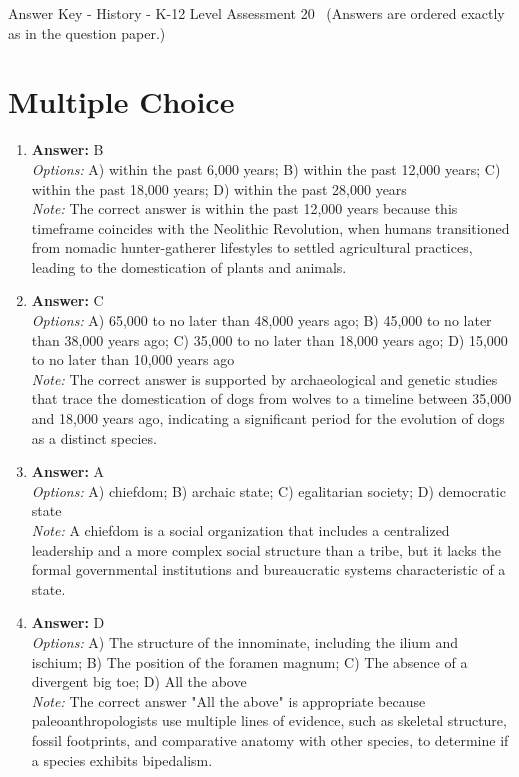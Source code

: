 \documentclass[12pt]{article}
\begin{document}
\begin{center}
Answer Key - History - K-12 Level Assessment 20 \
\small (Answers are ordered exactly as in the question paper.)
\end{center}

\section*{Multiple Choice}
\begin{enumerate}[label=\arabic*.]
\item \textbf{Answer:} B
\\ \textit{Options:} A) within the past 6,000 years; B) within the past 12,000 years; C) within the past 18,000 years; D) within the past 28,000 years
\\ \textit{Note:} The correct answer is within the past 12,000 years because this timeframe coincides with the Neolithic Revolution, when humans transitioned from nomadic hunter-gatherer lifestyles to settled agricultural practices, leading to the domestication of plants and animals.
\item \textbf{Answer:} C
\\ \textit{Options:} A) 65,000 to no later than 48,000 years ago; B) 45,000 to no later than 38,000 years ago; C) 35,000 to no later than 18,000 years ago; D) 15,000 to no later than 10,000 years ago
\\ \textit{Note:} The correct answer is supported by archaeological and genetic studies that trace the domestication of dogs from wolves to a timeline between 35,000 and 18,000 years ago, indicating a significant period for the evolution of dogs as a distinct species.
\item \textbf{Answer:} A
\\ \textit{Options:} A) chiefdom; B) archaic state; C) egalitarian society; D) democratic state
\\ \textit{Note:} A chiefdom is a social organization that includes a centralized leadership and a more complex social structure than a tribe, but it lacks the formal governmental institutions and bureaucratic systems characteristic of a state.
\item \textbf{Answer:} D
\\ \textit{Options:} A) The structure of the innominate, including the ilium and ischium; B) The position of the foramen magnum; C) The absence of a divergent big toe; D) All the above
\\ \textit{Note:} The correct answer "All the above" is appropriate because paleoanthropologists use multiple lines of evidence, such as skeletal structure, fossil footprints, and comparative anatomy with other species, to determine if a species exhibits bipedalism.

\end{enumerate}
\end{document}
